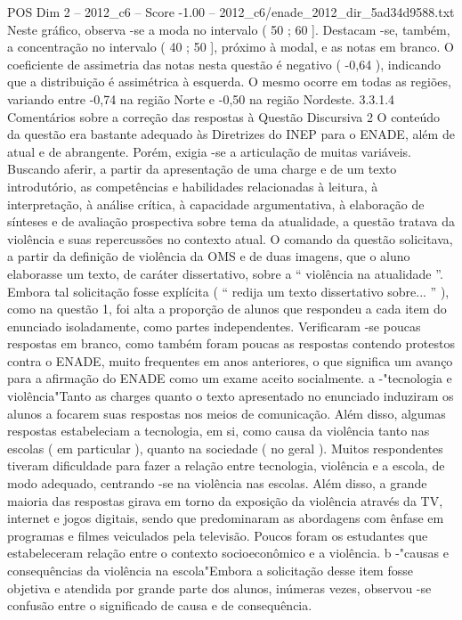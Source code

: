 \begin{textsample}{POS Dim 2 – 2012\_c6 – Score -1.00 – 2012\_c6/enade\_2012\_dir\_5ad34d9588.txt}
Neste gráfico, observa -se a moda no intervalo ( 50 ; 60 ].
Destacam -se, também, a concentração no intervalo ( 40 ; 50 ], próximo à modal, e as notas em branco.
O coeficiente de assimetria das notas nesta questão é negativo ( -0,64 ), indicando que a distribuição é assimétrica à esquerda.
O mesmo ocorre em todas as regiões, variando entre -0,74 na região Norte e -0,50 na região Nordeste. 3.3.1.4 Comentários sobre a correção das respostas à Questão Discursiva 2 O conteúdo da questão era bastante adequado às Diretrizes do INEP para o ENADE, além de atual e de abrangente.
Porém, exigia -se a articulação de muitas variáveis.
Buscando aferir, a partir da apresentação de uma charge e de um texto introdutório, as competências e habilidades relacionadas à leitura, à interpretação, à análise crítica, à capacidade argumentativa, à elaboração de sínteses e de avaliação prospectiva sobre tema da atualidade, a questão tratava da violência e suas repercussões no contexto atual.
O comando da questão solicitava, a partir da definição de violência da OMS e de duas imagens, que o aluno elaborasse um texto, de caráter dissertativo, sobre a “ violência na atualidade ”.
Embora tal solicitação fosse explícita ( “ redija um texto dissertativo sobre... ” ), como na questão 1, foi alta a proporção de alunos que respondeu a cada item do enunciado isoladamente, como partes independentes.
Verificaram -se poucas respostas em branco, como também foram poucas as respostas contendo protestos contra o ENADE, muito frequentes em anos anteriores, o que significa um avanço para a afirmação do ENADE como um exame aceito socialmente. a -"tecnologia e violência"Tanto as charges quanto o texto apresentado no enunciado induziram os alunos a focarem suas respostas nos meios de comunicação.
Além disso, algumas respostas estabeleciam a tecnologia, em si, como causa da violência tanto nas escolas ( em particular ), quanto na sociedade ( no geral ).
Muitos respondentes tiveram dificuldade para fazer a relação entre tecnologia, violência e a escola, de modo adequado, centrando -se na violência nas escolas.
Além disso, a grande maioria das respostas girava em torno da exposição da violência através da TV, internet e jogos digitais, sendo que predominaram as abordagens com ênfase em programas e filmes veiculados pela televisão.
Poucos foram os estudantes que estabeleceram relação entre o contexto socioeconômico e a violência. b -"causas e consequências da violência na escola"Embora a solicitação desse item fosse objetiva e atendida por grande parte dos alunos, inúmeras vezes, observou -se confusão entre o significado de causa e de consequência.

\end{textsample}
